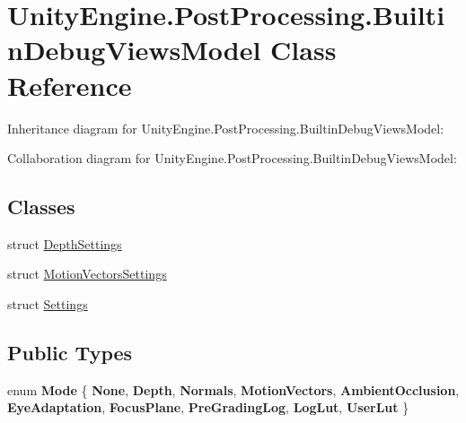 \hypertarget{class_unity_engine_1_1_post_processing_1_1_builtin_debug_views_model}{}\section{Unity\+Engine.\+Post\+Processing.\+Builtin\+Debug\+Views\+Model Class Reference}
\label{class_unity_engine_1_1_post_processing_1_1_builtin_debug_views_model}


Inheritance diagram for Unity\+Engine.\+Post\+Processing.\+Builtin\+Debug\+Views\+Model\+:


Collaboration diagram for Unity\+Engine.\+Post\+Processing.\+Builtin\+Debug\+Views\+Model\+:
\subsection*{Classes}
\begin{DoxyCompactItemize}
\item 
struct \hyperlink{struct_unity_engine_1_1_post_processing_1_1_builtin_debug_views_model_1_1_depth_settings}{Depth\+Settings}
\item 
struct \hyperlink{struct_unity_engine_1_1_post_processing_1_1_builtin_debug_views_model_1_1_motion_vectors_settings}{Motion\+Vectors\+Settings}
\item 
struct \hyperlink{struct_unity_engine_1_1_post_processing_1_1_builtin_debug_views_model_1_1_settings}{Settings}
\end{DoxyCompactItemize}
\subsection*{Public Types}
\begin{DoxyCompactItemize}
\item 
\mbox{\label{class_unity_engine_1_1_post_processing_1_1_builtin_debug_views_model_a55c35be6eba5f7bb9476323f3c30de36}} 
enum {\bfseries Mode} \{ \newline
{\bfseries None}, 
{\bfseries Depth}, 
{\bfseries Normals}, 
{\bfseries Motion\+Vectors}, 
\newline
{\bfseries Ambient\+Occlusion}, 
{\bfseries Eye\+Adaptation}, 
{\bfseries Focus\+Plane}, 
{\bfseries Pre\+Grading\+Log}, 
\newline
{\bfseries Log\+Lut}, 
{\bfseries User\+Lut}
 \}
\end{DoxyCompactItemize}

